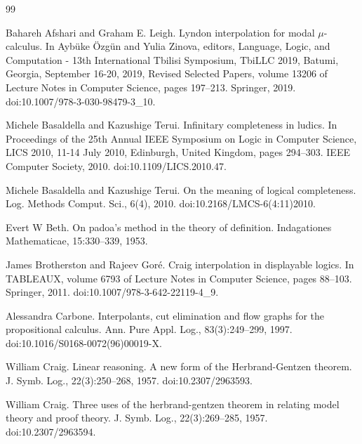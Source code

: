 \documentclass[10pt,a4paper]{article}
\begin{document}
\begin{thebibliography}{99}
\par\noindent    Bahareh Afshari and Graham E. Leigh.  Lyndon interpolation for modal $\mu$-calculus.  In Aybüke Özgün and Yulia Zinova, editors, Language, Logic, and Computation - 13th International Tbilisi Symposium, TbiLLC 2019, Batumi, Georgia, September 16-20, 2019, Revised Selected Papers, volume 13206 of Lecture Notes in Computer Science, pages 197–213. Springer, 2019.  doi:10.1007/978-3-030-98479-3\_10.  

\par\noindent    Michele Basaldella and Kazushige Terui.  Infinitary completeness in ludics.  In Proceedings of the 25th Annual IEEE Symposium on Logic in Computer Science, LICS 2010, 11-14 July 2010, Edinburgh, United Kingdom, pages 294–303. IEEE Computer Society, 2010.  doi:10.1109/LICS.2010.47.  

\par\noindent    Michele Basaldella and Kazushige Terui.  On the meaning of logical completeness.  Log. Methods Comput. Sci., 6(4), 2010.  doi:10.2168/LMCS-6(4:11)2010.  

\par\noindent    Evert W Beth.  On padoa’s method in the theory of definition.  Indagationes Mathematicae, 15:330–339, 1953.  

\par\noindent    James Brotherston and Rajeev Goré.  Craig interpolation in displayable logics.  In TABLEAUX, volume 6793 of Lecture Notes in Computer Science, pages 88–103. Springer, 2011.  doi:10.1007/978-3-642-22119-4\_9.  

\par\noindent    Alessandra Carbone.  Interpolants, cut elimination and flow graphs for the propositional calculus.  Ann. Pure Appl. Log., 83(3):249–299, 1997.  doi:10.1016/S0168-0072(96)00019-X.  

\par\noindent    William Craig.  Linear reasoning. A new form of the Herbrand-Gentzen theorem.  J. Symb. Log., 22(3):250–268, 1957.  doi:10.2307/2963593.  

\par\noindent    William Craig.  Three uses of the herbrand-gentzen theorem in relating model theory and proof theory.  J. Symb. Log., 22(3):269–285, 1957.  doi:10.2307/2963594.  


\end{thebibliography}
\end{document}

